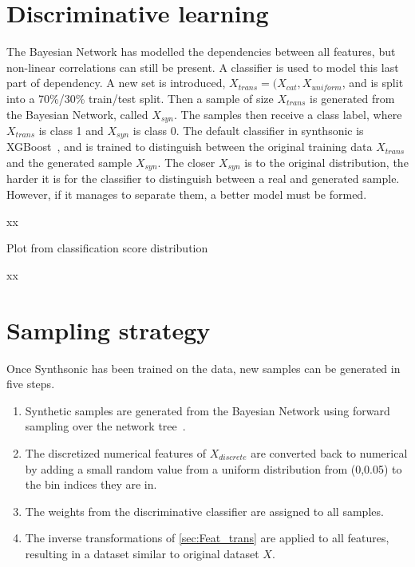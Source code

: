 \section{Discriminative learning}
The Bayesian Network has modelled the dependencies between all features, but non-linear correlations can still be present. A classifier is used to model this last part of dependency. A new set is introduced, $X_{trans} = (X_{cat},X_{uniform}$, and is split into a 70\%/30\% train/test split. Then a sample of size $X_{trans}$ is generated from the Bayesian Network, called $X_{syn}$. The samples then receive a class label, where $X_{trans}$ is class 1 and $X_{syn}$ is class 0. The default classifier in synthsonic is XGBoost~\cite{Chen2016XGBoost:System}, and is trained to distinguish between the original training data $X_{trans}$ and the generated sample $X_{syn}$. The closer $X_{syn}$ is to the original distribution, the harder it is for the classifier to distinguish between a real and generated sample. However, if it manages to separate them, a better model must be formed. 

xx

Plot from classification score distribution

xx

\section{Sampling strategy}
Once Synthsonic has been trained on the data, new samples can be generated in five steps.
\begin{enumerate}
    \item Synthetic samples are generated from the Bayesian Network using forward sampling over the network tree~\cite{Guo2002AInference}.
    \item The discretized numerical features of $X_{discrete}$ are converted back to numerical by adding a small random value from a uniform distribution from (0,0.05) to the bin indices they are in. 
    \item The weights from the discriminative classifier are assigned to all samples. 
    \item The inverse transformations of \ref{sec:Feat_trans} are applied to all features, resulting in a dataset similar to original dataset $X$.
\end{enumerate}